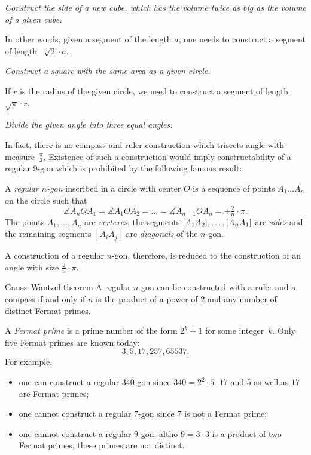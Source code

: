  {\it Construct the side of a new cube, 
which has the volume twice as big as the volume of a given cube.} 

\medskip

In other words, 
given a segment of the length $a$,
one needs to construct a segment of length~$\sqrt[3]{2}\cdot a$.

 {\it Construct a square with the same area as a given circle.} 

\medskip

If $r$ is the radius of the given circle, we need to construct a segment of length~$\sqrt{\pi}\cdot r$. 

{\it Divide the given angle into three equal angles.}

\medskip

In fact, there is no compass-and-ruler construction which trisects angle with measure~$\tfrac\pi3$. 
Existence of such a construction would imply constructability of a regular 9-gon which is prohibited by the following famous result:

A \emph{regular $n$-gon} inscribed in a circle with center $O$ is a sequence of points $A_1\dots A_n$ on the circle such that 
\[\measuredangle A_nOA_1=\measuredangle A_1OA_2=\dots=\measuredangle A_{n-1}OA_n=\pm\tfrac2n\cdot \pi.\]
The points $A_1,\dots, A_n$ are \emph{vertexes},
the segments $[A_1A_2], \z\dots, [A_nA_1]$ are \emph{sides} 
and the remaining segments $[A_iA_j]$ are \emph{diagonals} of the $n$-gon.

A construction of a regular $n$-gon, therefore, is reduced to the construction of an angle with size $\tfrac2n\cdot \pi$.

\begin{thm}{Gauss--Wantzel theorem}
A regular $n$-gon can be constructed with a ruler and a compass 
if and only if 
$n$ is the product of a power of $2$ and any number of distinct Fermat primes.
\end{thm}

A \emph{Fermat prime} is a prime number of the form $2^k+1$ for some integer~$k$.
Only five Fermat primes are known  today:
$$3, 5, 17, 257, 65537.$$
For example, 
\begin{itemize}
\item one can construct a regular 340-gon since $340=2^2\cdot 5\cdot 17$ and $5$ as well as $17$ are Fermat primes;
\item one cannot construct a regular 7-gon since $7$ is not a Fermat prime;
\item one cannot construct a regular 9-gon; 
altho $9=3\cdot 3$ is a product of two Fermat primes, 
these primes are not distinct.
\end{itemize}

